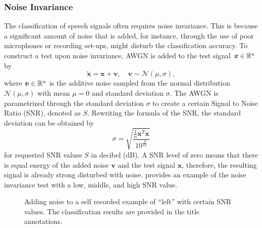 \subsubsection{Noise Invariance}
The classification of speech signals often requires noise invariance.
This is because a significant amount of noise that is added, for instance, through the use of poor microphones or recording set-ups, might disturb the classification accuracy.
To construct a test upon noise invariance, AWGN is added to the test signal $\bm{x} \in \mathbb{R}^n$ by
\begin{equation}
  \bm{\tilde{x}} = \bm{x} + \bm{v}, \quad \bm{v} \sim \mathcal{N}(\mu, \sigma),
\end{equation}
where $\bm{v} \in \mathbb{R}^n$ is the additive noise sampled from the normal distribution $\mathcal{N}(\mu, \sigma)$ with mean $\mu = 0$ and standard deviation $\sigma$.
The AWGN is parametrized through the standard deviation $\sigma$ to create a certain Signal to Noise Ratio (SNR), denoted as $S$.
Rewriting the formula of the SNR, the standard deviation can be obtained by
\begin{equation}
  \sigma = \sqrt{\frac{\frac{1}{n}\bm{x}^T \bm{x}}{10^{\frac{S}{10}}}}
\end{equation}
for requested SNR values $S$ in decibel (dB).
A SNR level of zero means that there is equal energy of the added noise $\bm{v}$ and the test signal $\bm{x}$, therefore, the resulting signal is already strong disturbed with noise.
 provides an example of the noise invariance test with a low, middle, and high SNR value.
\begin{figure}[!ht]
  \centering
    \quad
  \caption{Adding noise to a self recorded example of \enquote{left} with certain SNR values. The classification results are provided in the title annotations.}
  \label{fig:exp_details_tb_noise_left}
\end{figure}
